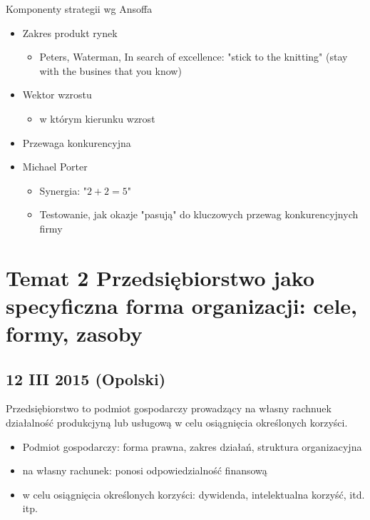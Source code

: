 \documentclass[a4paper,10pt]{report}
\begin{document}
\noindent Komponenty strategii wg Ansoffa
\begin{itemize}
	\item Zakres produkt rynek
	\begin{itemize}
		\item Peters, Waterman, In search of excellence: "stick to the knitting" (stay with the busines that you know)
	\end{itemize}
	\item Wektor wzrostu
	\begin{itemize}
		\item w którym kierunku wzrost
	\end{itemize}
	\item Przewaga konkurencyjna
	\item Michael Porter
	\begin{itemize}
		\item Synergia: "$2 + 2 = 5$"
		\item Testowanie, jak okazje "pasują" do kluczowych przewag konkurencyjnych firmy
	\end{itemize}
\end{itemize}

\chapter{
Temat 2 Przedsiębiorstwo jako specyficzna forma organizacji: cele, formy, zasoby}

\section{12 III 2015 (Opolski)}

\noindent Przedsiębiorstwo to podmiot gospodarczy prowadzący na własny rachnuek działalność produkcjyną lub usługową w celu osiągnięcia określonych korzyści.

\begin{itemize}
	\item Podmiot gospodarczy: forma prawna, zakres działań, struktura organizacyjna
	\item na własny rachunek: ponosi odpowiedzialność finansową
	\item w celu osiągnięcia określonych korzyści: dywidenda, intelektualna korzyść, itd. itp.
\end{itemize}
\end{document}
